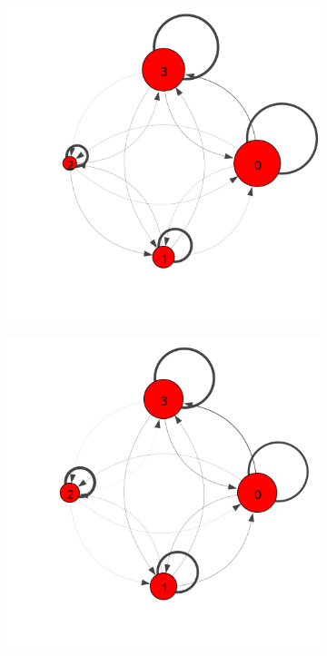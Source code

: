\begin{figure}
  \vspace{12pt}
  \centering
  \begin{subfigure}[t]{0.25\textwidth}
    \includegraphics[width=\textwidth,trim={0 3cm 0 2cm}]{../figures/trans-comp/trans-avg.png}
    \caption{\label{fig:trans-avg}}
  \end{subfigure}%
  \begin{subfigure}[t]{0.25\textwidth}
    \includegraphics[width=\textwidth,trim={0, 3cm 0 2cm}]{../figures/trans-comp/trans-perfect.png}

\end{subfigure}
\end{figure}
